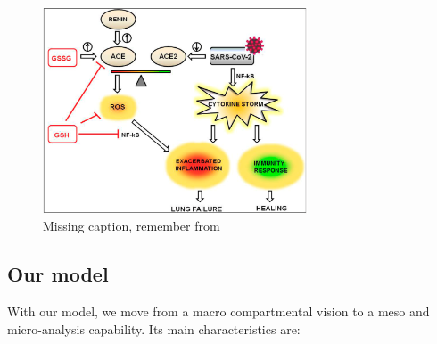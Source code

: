\documentclass[graybox]{svmult}
\begin{document}
\begin{figure}[t]
\center
\includegraphics[width=0.7\textwidth]{ace.png}
\caption{Missing caption, remember from \cite{Silvagno_2020}}
\label{ace}
\end{figure}




\subsection{Our model}
\label{ourModel}

With our model, we move from a macro compartmental vision to a meso and micro-analysis capability. Its main characteristics are:
\end{document}
